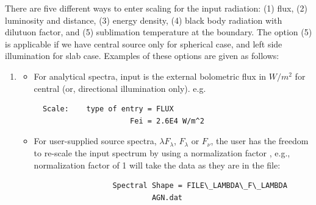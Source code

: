 \documentclass[11pt]{article}
\begin{document}
There are five different ways to enter scaling for the input radiation: (1)
flux, (2) luminosity and distance, (3) energy density, (4) black body radiation
with dilutuon factor, and (5) sublimation temperature at the boundary. The
option (5) is applicable if we have central source only for spherical case, and
left side illumination for slab case. Examples of these  options are given as
follows:
%
\begin{enumerate}
%
\item
\begin{itemize}
%
\item For analytical spectra, input is the external bolometric flux in
    $W/m^2$ for central (or, directional illumination only). e.g.
\begin{verbatim}
  Scale:    type of entry = FLUX
                      Fei = 2.6E4 W/m^2
\end{verbatim}
%
\item For user-supplied source spectra, $\lambda F_{\lambda}$,
    $F_{\lambda}$ or $F_{\nu}$, the user has the freedom to re-scale
    the input spectrum by using a normalization factor , e.g.,
    normalization factor of 1 will take the data as they are in the
    file:
%
\begin{verbatim}
                  Spectral Shape = FILE\_LAMBDA\_F\_LAMBDA
                           AGN.dat


\end{verbatim}
\end{itemize}
\end{enumerate}
\end{document}

